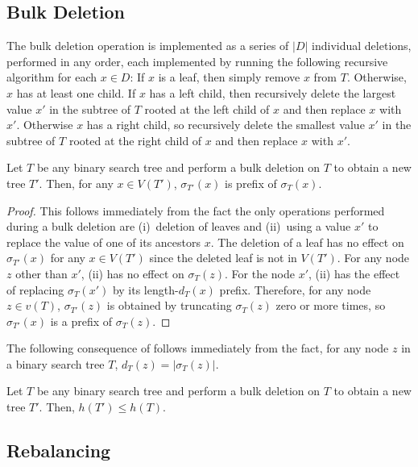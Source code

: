 \documentclass[kpfonts]{patmorin}
\begin{document}
\subsection{Bulk Deletion}

The bulk deletion operation is implemented as a series of $|D|$ individual deletions, performed in any order, each implemented by running the following recursive algorithm for each $x\in D$:  If $x$ is a leaf, then simply remove $x$ from $T$.  Otherwise, $x$ has at least one child.  If $x$ has a left child, then recursively delete the largest value $x'$ in the subtree of $T$ rooted at the left child of $x$ and then replace $x$ with $x'$.  Otherwise $x$ has a right child, so recursively delete the smallest value $x'$ in the subtree of $T$ rooted at the right child of $x$ and then replace $x$ with $x'$.


\begin{lem}
  Let $T$ be any binary search tree and perform a bulk deletion on $T$ to obtain a new tree $T'$.  Then, for any $x\in V(T')$, $\sigma_{T'}(x)$ is prefix of $\sigma_T(x)$.
\end{lem}

\begin{proof}
  This follows immediately from the fact the only operations performed during a bulk deletion are (i)~deletion of leaves and (ii)~using a value $x'$ to replace the value of one of its ancestors $x$.  The deletion of a leaf has no effect on $\sigma_{T'}(x)$ for any $x\in V(T')$ since the deleted leaf is not in $V(T')$.  For any node $z$ other than $x'$, (ii) has no effect on $\sigma_T(z)$.  For the node $x'$, (ii) has the effect of replacing $\sigma_T(x')$ by its length-$d_T(x)$ prefix.  Therefore, for any node $z\in v(T)$, $\sigma_{T'}(z)$ is obtained by truncating $\sigma_{T}(z)$ zero or more times, so $\sigma_{T'}(x)$ is a prefix of $\sigma_T(z)$.
\end{proof}

The following consequence of  follows immediately from the fact, for any node $z$ in a binary search tree $T$, $d_T(z)=|\sigma_T(z)|$.

\begin{lem}
  Let $T$ be any binary search tree and perform a bulk deletion on $T$ to obtain a new tree $T'$.  Then, $h(T')\le h(T)$.
\end{lem}


\subsection{Rebalancing}
\end{document}

